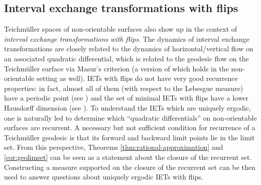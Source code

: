 



\subsection*{Interval exchange transformations with flips}

Teichm\"uller spaces of non-orientable surfaces also show up in the context of \emph{interval exchange transformations with flips}.
The dynamics of interval exchange transformations are closely related to the dynamics of horizontal/vertical flow on an associated quadratic differential, which is related to the geodesic flow on the Teichm\"uller surface via Masur's criterion (a version of which holds in the non-orientable setting as well).
IETs with flips do not have very good recurrence properties: in fact, almost all of them (with respect to the Lebesgue measure) have a periodic point (see \cite{nogueira_1989}) and the set of minimal IETs with flips have a lower Hausdorff dimension (see \cite{skripchenko2018hausdorff}).
To understand the IETs which are uniquely ergodic, one is naturally led to determine which ``quadratic differentials'' on non-orientable surfaces are recurrent.
A necessary but not sufficient condition for recurrence of a Teichm\"uller geodesic is that its forward and backward limit points lie in the limit set.
From this perspective, Theorems \ref{thm:rational-approximation} and \ref{cor:geolimset} can
be seen as a statement about the closure of the recurrent set.
Constructing a measure supported on the closure of the recurrent set can be then used to answer questions about uniquely ergodic IETs with flips.

